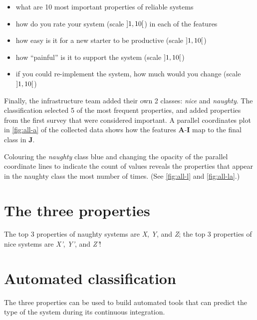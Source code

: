 \documentclass[10 pt, twocolumn]{article}
\begin{document}
\begin{itemize}
  \item what are 10 most important properties of reliable systems
  \item how do you rate your system (scale $\interval[open]{1}{10}$) in each of the features
  \item how easy is it for a new starter to be productive (scale $\interval[open]{1}{10}$)
  \item how ``painful'' is it to support the system (scale $\interval[open]{1}{10}$)
  \item if you could re-implement the system, how much would you change (scale $\interval[open]{1}{10}$)
\end{itemize}

Finally, the infrastructure team added their own 2 classes: \emph{nice} and \emph{naughty}. The classification selected 5 of the most frequent properties, and added properties from the first survey that were considered important. A parallel coordinates plot in \autoref{fig:all-a} of the collected data shows how the features \textbf{A}-\textbf{I} map to the final class in \textbf{J}.


Colouring the \emph{naughty} class blue and changing the opacity of the parallel coordinate lines to indicate the count of values reveals the properties that appear in the naughty class the most number of times. (See \autoref{fig:all-l} and \autoref{fig:all-la}.)


\section{The three properties}
The top 3 properties of naughty systems are \emph{X}, \emph{Y}, and \emph{Z}; the top 3 properties of nice systems are \emph{X'}, \emph{Y'}, and \emph{Z'}!

\section{Automated classification}
The three properties can be used to build automated tools that can predict the type of the system during its continuous integration. 

\end{document}
